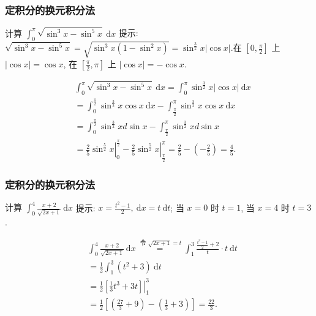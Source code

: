 \documentclass[
10pt,
aspectratio=43,
]{beamer}
\begin{document}
\begin{frame}
	\frametitle{定积分的换元积分法}
	\everymath{\displaystyle}
	\begin{block}{计算 $\int_0^\pi \sqrt{\sin ^3 x-\sin ^5 x} \mathrm{~d} x$}
		提示: $\sqrt{\sin ^3 x-\sin ^5 x}=\sqrt{\sin ^3 x\left(1-\sin ^2 x\right)}=\sin ^{\frac{3}{2}} x|\cos x|$.在 $\left[0, \frac{\pi}{2}\right]$ 上 $|\cos x|=\cos x$, 在 $\left[\frac{\pi}{2}, \pi\right]$ 上 $|\cos x|=-\cos x$.
	\end{block}
	\pause
	\begin{exampleblock}{}
		$$
			\begin{aligned}
				 & \int_0^\pi \sqrt{\sin ^3 x-\sin ^5 x} \mathrm{~d} x=\int_0^\pi \sin ^{\frac{3}{2}} x|\cos x| \mathrm{~d} x                                                                               \\
				 & =\int_0^{\frac{\pi}{2}} \sin ^{\frac{3}{2}} x \cos x \mathrm{~d} x-\int_{\frac{\pi}{2}}^\pi \sin ^{\frac{3}{2}} x \cos x \mathrm{~d} x                                                   \\
				 & =\int_0^{\frac{\pi}{2}} \sin ^{\frac{3}{2}} x d \sin x-\int_{\frac{\pi}{2}}^\pi \sin ^{\frac{3}{2}} x d \sin x                                                                           \\
				 & =\left.\frac{2}{5} \sin ^{\frac{5}{2}} x\right|_0^{\frac{\pi}{2}}-\left.\frac{2}{5} \sin ^{\frac{5}{2}} x\right|_{\frac{\pi}{2}}^\pi=\frac{2}{5}-\left(-\frac{2}{5}\right)=\frac{4}{5} .
			\end{aligned}
		$$
	\end{exampleblock}
\end{frame}

\begin{frame}
	\frametitle{定积分的换元积分法}
	\everymath{\displaystyle}
	\begin{block}{计算 $\int_0^4 \frac{x+2}{\sqrt{2 x+1}} \mathrm{~d} x$}
		提示: $x=\frac{t^2-1}{2}, \mathrm{~d}x=t\mathrm{~d}t$; 当 $x=0$ 时 $t=1$, 当 $x=4$ 时 $t=3$.
	\end{block}
	\pause
	\begin{exampleblock}{}
		$$
			\begin{aligned}
				 & \int_0^4 \frac{x+2}{\sqrt{2 x+1}} \mathrm{~d} x \stackrel{\text { 令 } \sqrt{2 x+1}=t}{=} \int_1^3 \frac{\frac{t^2-1}{2}+2}{t} \cdot t \mathrm{~d} t \\
				 & =\frac{1}{2} \int_1^3\left(t^2+3\right) \mathrm{~d} t                                                                                               \\
				 & =\left.\frac{1}{2}\left[\frac{1}{3} t^3+3 t\right]\right|_1 ^3                                                                                      \\
				 & =\frac{1}{2}\left[\left(\frac{27}{3}+9\right)-\left(\frac{1}{3}+3\right)\right]=\frac{22}{3} .
			\end{aligned}
		$$
	\end{exampleblock}
\end{frame}
\end{document}
